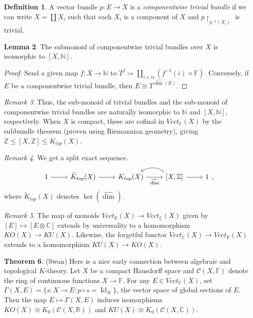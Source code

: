 \documentclass[10pt,letterpaper,cm]{nupset}
\theoremstyle{definition}
\newtheorem{definition}{Definition}
\theoremstyle{theorem}
\newtheorem{theorem}[definition]{Theorem}
\newtheorem{lemma}[definition]{Lemma}
\theoremstyle{remark}
\newtheorem{remark}[definition]{Remark}
\newcommand{\C}{\mathbb C}
\newcommand{\F}{\mathbb F}
\newcommand{\N}{\mathbb N}
\newcommand{\R}{\mathbb R}
\newcommand{\Z}{\mathbb Z}
\newcommand{\1}{\mathbf{1}}
\newcommand{\0}{\vec 0}
\DeclareMathOperator{\id}{Id}
\begin{document}
\begin{definition}
A vector bundle $p: E \to X$ is a \textit{componentwise trivial bundle} if we can write $X =\coprod X_i$ such that each $X_i$ is a component of $X$ and $p\restriction_{p^{-1}(X_i)}$ is trivial. 
\end{definition}
\begin{lemma}
The submonoid of componentwise trivial bundles over $X$ is isomorphic to $[X, \N]$.
\end{lemma}
\begin{proof}
Send a given map $f: X \to \N$ to $T^f \coloneqq \coprod_{i \in \N} (f^{-1}(i) \times \F)$. Conversely, if $E$ be a componentwise trivial bundle, then $E \cong T^{\widehat{\dim}(E)}$.
\end{proof}

\begin{remark}
Thus, the sub-monoid  of trivial bundles and the sub-monoid of componentwise trivial bundles are naturally isomorphic to $\N$ and $[X, \N]$, respectively.  When $X$ is compact, these are cofinal in $Vect_{\F}(X)$ by the subbundle theorem (proven using Riemannian geometry), giving $\Z \leq [X, \Z] \leq K_{top}(X)$.
\end{remark}

\begin{remark}
We get a split exact sequence. 
\[
\begin{tikzcd}
1 \arrow[r] & \widetilde{K}_{top}(X) \arrow[r] & K_{top}(X) \arrow[r, "\widehat{\dim}"'] & {[X, \mathbb Z]} \arrow[r] \arrow[l, hook, bend right] & 1
\end{tikzcd},
\] where $\widetilde{K}_{top}(X)$ denotes $\ker(\widehat{\dim})$.
\end{remark}

\begin{remark}
The map of monoids $Vect_{\R}(X) \to Vect_{\C}(X)$ given by $[E] \mapsto [E \otimes \C]$ extends by universality to a homomorphism $KO(X) \to KU(X)$. Likewise, the forgetful functor $Vect_{\C}(X) \to Vect_{\R}(X)$ extends to a homomorphism $KU(X) \to KO(X)$.
\end{remark}

\begin{theorem}{(Swan)}
Here is a nice early connection between algebraic and topological $K$-theory. Let $X$ be a compact Hausdorff space and $\mathcal C(X, \F)$ denote the ring of continuous functions $X \to \F$. For any $E \in Vect_{\F}(X)$, set $\Gamma(X, E) = \{s: X \to E : p \circ s = \id_X\}$, the vector space of global sections of $E$. Then the map $E \mapsto \Gamma(X, E)$ induces isomorphisms $KO(X) \cong K_0(\mathcal C(X, \R))$ and $KU(X) \cong K_0( \mathcal C(X, \C))$.
\end{theorem}
\end{document}
